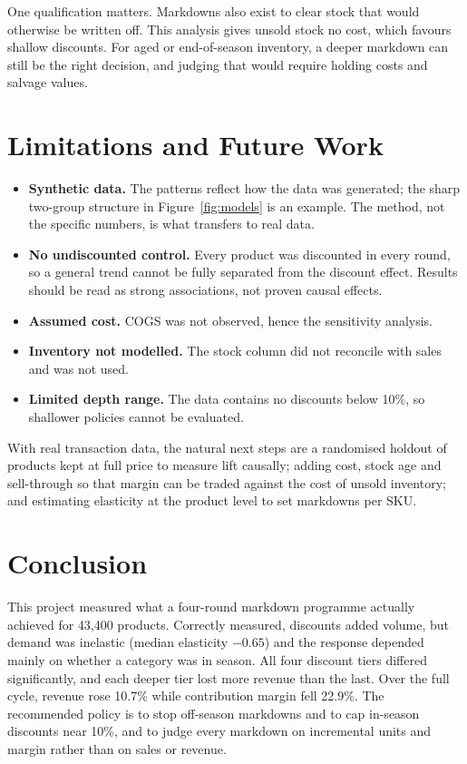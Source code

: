 \documentclass[11pt, a4paper]{article}
\begin{document}
One qualification matters. Markdowns also exist to clear stock that would otherwise be written off. This analysis gives unsold stock no cost, which favours shallow discounts. For aged or end-of-season inventory, a deeper markdown can still be the right decision, and judging that would require holding costs and salvage values.

\section{Limitations and Future Work}
\begin{itemize}
  \item \textbf{Synthetic data.} The patterns reflect how the data was generated; the sharp two-group structure in Figure~\ref{fig:models} is an example. The method, not the specific numbers, is what transfers to real data.
  \item \textbf{No undiscounted control.} Every product was discounted in every round, so a general trend cannot be fully separated from the discount effect. Results should be read as strong associations, not proven causal effects.
  \item \textbf{Assumed cost.} COGS was not observed, hence the sensitivity analysis.
  \item \textbf{Inventory not modelled.} The stock column did not reconcile with sales and was not used.
  \item \textbf{Limited depth range.} The data contains no discounts below 10\%, so shallower policies cannot be evaluated.
\end{itemize}
With real transaction data, the natural next steps are a randomised holdout of products kept at full price to measure lift causally; adding cost, stock age and sell-through so that margin can be traded against the cost of unsold inventory; and estimating elasticity at the product level to set markdowns per SKU.

\section{Conclusion}
This project measured what a four-round markdown programme actually achieved for 43,400 products. Correctly measured, discounts added volume, but demand was inelastic (median elasticity $-0.65$) and the response depended mainly on whether a category was in season. All four discount tiers differed significantly, and each deeper tier lost more revenue than the last. Over the full cycle, revenue rose 10.7\% while contribution margin fell 22.9\%. The recommended policy is to stop off-season markdowns and to cap in-season discounts near 10\%, and to judge every markdown on incremental units and margin rather than on sales or revenue.
\end{document}
